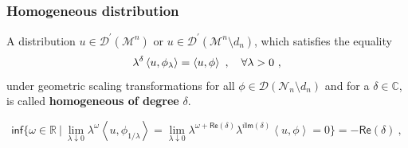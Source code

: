 \documentclass[9pt]{beamer}
\newcommand{\sm}[1]{\left\langle #1 \right\rangle}
\renewcommand{\inf}{\mathsf{inf}}
\renewcommand{\Re}{\mathsf{Re}}
\renewcommand{\Im}{\mathsf{Im}}
\newcommand{\Dcal}{\mathcal{D}}
\newcommand{\Mcal}{\mathcal{M}}
\newcommand{\Ncal}{\mathcal{N}}
\newcommand{\Cbb}{\mathbb{C}}
\newcommand{\Rbb}{\mathbb{R}}
\begin{document}
\begin{frame}[label=details_homog]

\frametitle{Homogeneous distribution}

\vfill

\begin{definition}
A distribution $u \in \Dcal^\prime(\Mcal^n)$ or $u\in \Dcal^\prime(\Mcal^n\setminus d_n)$, which satisfies the equality 
%
\vspace*{-5pt}
\begin{equation*}
\lambda^{\delta} \sm{ u , \phi_\lambda } = \sm{ u , \phi } \ , \quad \forall \lambda > 0 \ , 
\vspace*{-5pt}
\end{equation*}
%
under geometric scaling transformations for all $\phi\in\Dcal(\Ncal_n\setminus d_n)$ and for a $\delta\in\Cbb$, is called \textbf{homogeneous of degree} $\delta$. 
\end{definition}

\vfill

\begin{equation*}
\inf\bigg\{ \omega \in \Rbb \ \bigg| \ \lim_{\lambda \downarrow 0} \lambda^\omega \sm{u,\phi_{1/\lambda}} = \lim_{\lambda \downarrow 0} \lambda^{\omega+\Re(\delta)} \lambda^{i\Im(\delta)} \sm{u,\phi}
= 0  \bigg\} = - \Re(\delta) \ ,
\end{equation*}

\vfill

\hfill\hyperlink{homog}{}

\end{frame}

\end{document}
